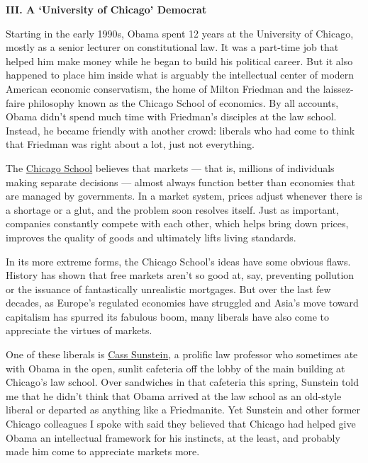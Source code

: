 \textbf{III. A `University of Chicago' Democrat}

Starting in the early 1990s, Obama spent 12 years at the University of
Chicago, mostly as a senior lecturer on constitutional law. It was a
part-time job that helped him make money while he began to build his
political career. But it also happened to place him inside what is
arguably the intellectual center of modern American economic
conservatism, the home of Milton Friedman and the laissez-faire
philosophy known as the Chicago School of economics. By all accounts,
Obama didn't spend much time with Friedman's disciples at the law
school. Instead, he became friendly with another crowd: liberals who had
come to think that Friedman was right about a lot, just not everything.

The
\href{http://www.pbs.org/wgbh/commandingheights/shared/video/qt/mini_p01_11_a_56.html}{Chicago
School} believes that markets --- that is, millions of individuals
making separate decisions --- almost always function better than
economies that are managed by governments. In a market system, prices
adjust whenever there is a shortage or a glut, and the problem soon
resolves itself. Just as important, companies constantly compete with
each other, which helps bring down prices, improves the quality of goods
and ultimately lifts living standards.

In its more extreme forms, the Chicago School's ideas have some obvious
flaws. History has shown that free markets aren't so good at, say,
preventing pollution or the issuance of fantastically unrealistic
mortgages. But over the last few decades, as Europe's regulated
economies have struggled and Asia's move toward capitalism has spurred
its fabulous boom, many liberals have also come to appreciate the
virtues of markets.

One of these liberals is
\href{http://www.law.harvard.edu/faculty/directory/facdir.php?id=552}{Cass
Sunstein}, a prolific law professor who sometimes ate with Obama in the
open, sunlit cafeteria off the lobby of the main building at Chicago's
law school. Over sandwiches in that cafeteria this spring, Sunstein told
me that he didn't think that Obama arrived at the law school as an
old-style liberal or departed as anything like a Friedmanite. Yet
Sunstein and other former Chicago colleagues I spoke with said they
believed that Chicago had helped give Obama an intellectual framework
for his instincts, at the least, and probably made him come to
appreciate markets more.

